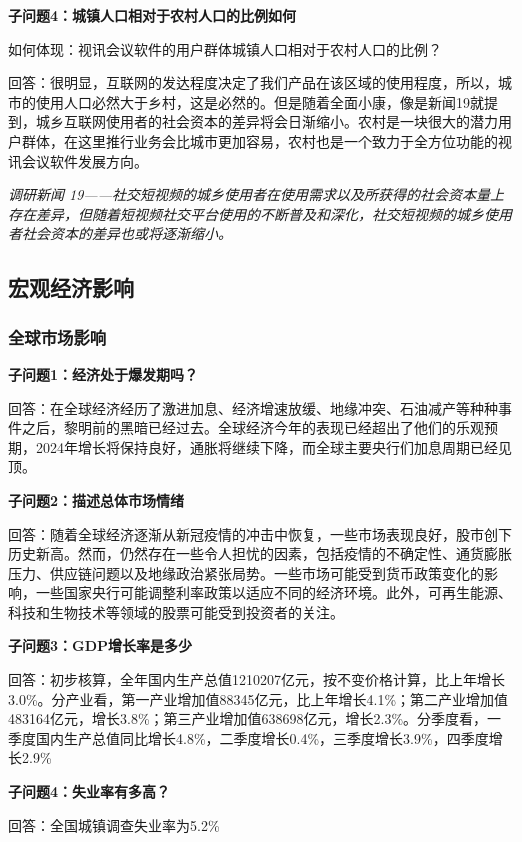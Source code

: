 \documentclass[a4paper,12pt]{article}
\begin{document}
    \textbf{子问题4：城镇人口相对于农村人口的比例如何}

    如何体现：视讯会议软件的⽤户群体城镇⼈⼝相对于农村⼈⼝的⽐例？

    回答：很明显，互联⽹的发达程度决定了我们产品在该区域的使⽤程度，所以，城市的使⽤⼈⼝必然⼤于乡村，这是必然的。但是随着全⾯⼩康，像是新闻19就提到，城乡互联⽹使⽤者的社会资本的差异将会⽇渐缩⼩。农村是⼀块很⼤的潜⼒⽤户群体，在这⾥推⾏业务会⽐城市更加容易，农村也是⼀个致⼒于全⽅位功能的视讯会议软件发展⽅向。

    \textit{调研新闻 19——社交短视频的城乡使⽤者在使⽤需求以及所获得的社会资本量上存在差异，但随着短视频社交平台使⽤的不断普及和深化，社交短视频的城乡使⽤者社会资本的差异也或将逐渐缩⼩。}

    \textit{}

    \subsection{宏观经济影响}
    \subsubsection{全球市场影响}
    \textbf{子问题1：经济处于爆发期吗？}

    回答：在全球经济经历了激进加息、经济增速放缓、地缘冲突、石油减产等种种事件之后，黎明前的黑暗已经过去。全球经济今年的表现已经超出了他们的乐观预期，2024年增长将保持良好，通胀将继续下降，而全球主要央行们加息周期已经见顶。

    \textbf{子问题2：描述总体市场情绪}

    回答：随着全球经济逐渐从新冠疫情的冲击中恢复，一些市场表现良好，股市创下历史新高。然而，仍然存在一些令人担忧的因素，包括疫情的不确定性、通货膨胀压力、供应链问题以及地缘政治紧张局势。一些市场可能受到货币政策变化的影响，一些国家央行可能调整利率政策以适应不同的经济环境。此外，可再生能源、科技和生物技术等领域的股票可能受到投资者的关注。

    \textbf{子问题3：GDP增长率是多少}

    回答：初步核算，全年国内生产总值1210207亿元，按不变价格计算，比上年增长3.0\%。分产业看，第一产业增加值88345亿元，比上年增长4.1\%；第二产业增加值483164亿元，增长3.8\%；第三产业增加值638698亿元，增长2.3\%。分季度看，一季度国内生产总值同比增长4.8\%，二季度增长0.4\%，三季度增长3.9\%，四季度增长2.9\%

    \textbf{子问题4：失业率有多高？}

    回答：全国城镇调查失业率为5.2\%
\end{document}
